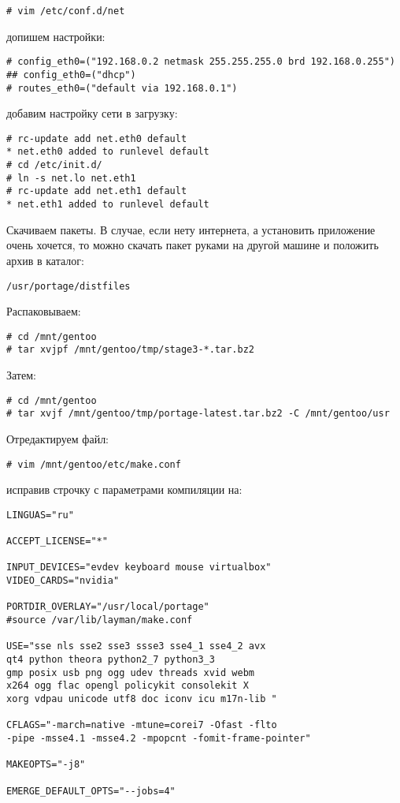 \documentclass[12pt, a6paper]{article}
\begin{document}
\begin{verbatim}
# vim /etc/conf.d/net
\end{verbatim}

допишем настройки:

\begin{verbatim}
# config_eth0=("192.168.0.2 netmask 255.255.255.0 brd 192.168.0.255")
## config_eth0=("dhcp")
# routes_eth0=("default via 192.168.0.1")
\end{verbatim}

добавим настройку сети в загрузку:

\begin{verbatim}
# rc-update add net.eth0 default
* net.eth0 added to runlevel default
# cd /etc/init.d/
# ln -s net.lo net.eth1
# rc-update add net.eth1 default
* net.eth1 added to runlevel default
\end{verbatim}

Скачиваем пакеты. 
В случае, если нету интернета, а установить приложение очень хочется, то можно скачать пакет руками на другой машине и положить архив в каталог:
\begin{verbatim}
/usr/portage/distfiles
\end{verbatim}

Распаковываем:

\begin{verbatim}
# cd /mnt/gentoo
# tar xvjpf /mnt/gentoo/tmp/stage3-*.tar.bz2
\end{verbatim}

Затем:

\begin{verbatim}
# cd /mnt/gentoo
# tar xvjf /mnt/gentoo/tmp/portage-latest.tar.bz2 -C /mnt/gentoo/usr
\end{verbatim}

Отредактируем файл:

\begin{verbatim}
# vim /mnt/gentoo/etc/make.conf
\end{verbatim}

исправив строчку с параметрами компиляции на:

\begin{verbatim}
LINGUAS="ru"

ACCEPT_LICENSE="*"

INPUT_DEVICES="evdev keyboard mouse virtualbox" 
VIDEO_CARDS="nvidia"

PORTDIR_OVERLAY="/usr/local/portage"
#source /var/lib/layman/make.conf

USE="sse nls sse2 sse3 ssse3 sse4_1 sse4_2 avx
qt4 python theora python2_7 python3_3 
gmp posix usb png ogg udev threads xvid webm  
x264 ogg flac opengl policykit consolekit X  
xorg vdpau unicode utf8 doc iconv icu m17n-lib "

CFLAGS="-march=native -mtune=corei7 -Ofast -flto 
-pipe -msse4.1 -msse4.2 -mpopcnt -fomit-frame-pointer"

MAKEOPTS="-j8"

EMERGE_DEFAULT_OPTS="--jobs=4"

\end{verbatim}
\end{document}
